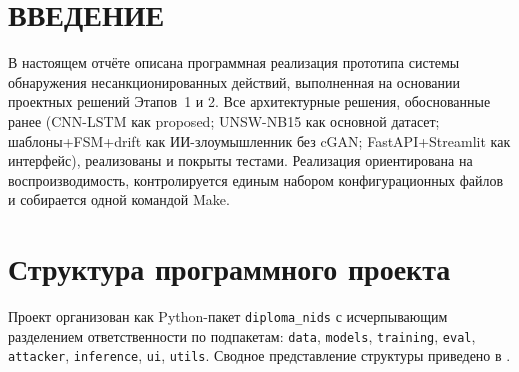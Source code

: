 \documentclass[14pt, a4paper]{extarticle}
\begin{document}
\newpage

\tableofcontents
\newpage

\section*{ВВЕДЕНИЕ}

В настоящем отчёте описана программная реализация прототипа системы
обнаружения несанкционированных действий, выполненная на основании
проектных решений Этапов~1 и 2. Все архитектурные решения, обоснованные
ранее (CNN-LSTM как proposed; UNSW-NB15 как основной датасет;
шаблоны+FSM+drift как ИИ-злоумышленник без cGAN; FastAPI+Streamlit как
интерфейс), реализованы и покрыты тестами. Реализация ориентирована на
воспроизводимость, контролируется единым набором конфигурационных файлов
и собирается одной командой Make.

\section{Структура программного проекта}

Проект организован как Python-пакет \texttt{diploma\_nids} с
исчерпывающим разделением ответственности по подпакетам:
\texttt{data}, \texttt{models}, \texttt{training}, \texttt{eval},
\texttt{attacker}, \texttt{inference}, \texttt{ui}, \texttt{utils}.
Сводное представление структуры приведено в .
\end{document}
